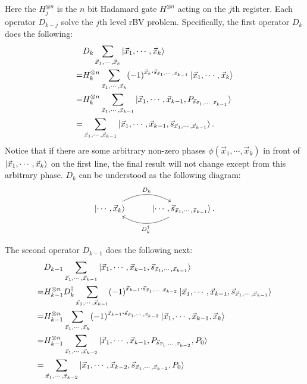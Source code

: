 \documentclass{article}
\begin{document}
Here the $H^{\otimes n}_j$ is the $n$ bit Hadamard gate $H^{\otimes n}$ acting
on the $j$th register. Each operator $D_{k-j}$ solve the $j$th level rBV
problem. Specifically, the first operator $D_k$ does the following:
\begin{align}
  & D_k \sum_{\vec{x}_1,\cdots,\vec{x}_k} \ket{\vec{x}_1,\cdots,\vec{x}_k}\nonumber\\ 
  = & H^{\otimes n}_k \sum_{\vec{x}_1,\cdots,\vec{x}_k}
  (-1)^{\vec{x}_k\vdot\vec{s}_{\vec{x}_1,\cdots,\vec{x}_{k-1}}} 
  \ket{\vec{x}_1,\cdots,\vec{x}_k} \\
  = & H_k^{\otimes n} \sum_{\vec{x}_1,\cdots,\vec{x}_{k-1}}
  \ket{\vec{x}_1,\cdots,\vec{x}_{k-1},P_{\vec{s}_{\vec{x}_1,\cdots,\vec{x}_{k-1}}}}
  \\
  = & \sum_{\vec{x}_1,\cdots,\vec{x}_{k-1}}
  \ket{\vec{x}_1,\cdots,\vec{x}_{k-1},\vec{s}_{\vec{x}_1,\cdots,\vec{x}_{k-1}}}.
\end{align}
Notice that if there are some arbitrary non-zero phases
$\phi(\vec{x}_1,\cdots,\vec{x}_k)$ in front of
$\ket{\vec{x}_1,\cdots,\vec{x}_k}$ on the first line, the final result will not
change except from this arbitrary phase. $D_k$ can be understood as the following
diagram:
\begin{equation}
\begin{tikzcd}
  \ket{\cdots,\vec{x}_k} \arrow[r, bend left, "D_k"] & 
   \arrow[l, bend left, "D^\dagger_k"] 
   \ket{\cdots,\vec{s}_{\vec{x}_1,\cdots,\vec{x}_{k-1}}}.
\end{tikzcd}
\end{equation}

The second operator $D_{k-1}$ does the following next:
\begin{align}
  & D_{k-1} \sum_{\vec{x}_1,\cdots,\vec{x}_{k-1}}
  \ket{\vec{x}_1,\cdots,\vec{x}_{k-1},\vec{s}_{\vec{x}_1,\cdots,\vec{x}_{k-1}}}
  \\
  =& H^{\otimes n}_{k-1} D^\dagger_k \sum_{\vec{x}_1,\cdots,\vec{x}_{k-1}} 
  (-1)^{\vec{x}_{k-1}\vdot \vec{s}_{\vec{x}_1,\cdots,\vec{x}_{k-2}}}
  \ket{\vec{x}_1,\cdots,\vec{x}_{k-1},\vec{s}_{\vec{x}_1,\cdots,\vec{x}_{k-1}}}
  \\
  =& H^{\otimes n}_{k-1} \sum_{\vec{x}_1,\cdots,\vec{x}_{k}}
  (-1)^{\vec{x}_{k-1}\vdot \vec{s}_{\vec{x}_1,\cdots,\vec{x}_{k-2}}}
  \ket{\vec{x}_1,\cdots,\vec{x}_{k-1},\vec{x}_{k}}
  \\
  =& H^{\otimes n}_{k-1} \sum_{\vec{x}_1,\cdots,\vec{x}_{k-2}}
  \ket{\vec{x}_1,\cdots,\vec{x}_{k-1},
  P_{\vec{s}_{\vec{x}_1,\cdots,\vec{x}_{k-2}}},P_0}
  \\
  =& \sum_{\vec{x}_1,\cdots,\vec{x}_{k-2}}
  \ket{\vec{x}_1,\cdots,\vec{x}_{k-2}, \vec{s}_{\vec{x}_1,\cdots,\vec{x}_{k-2}},P_0}
\end{align}
\end{document}
